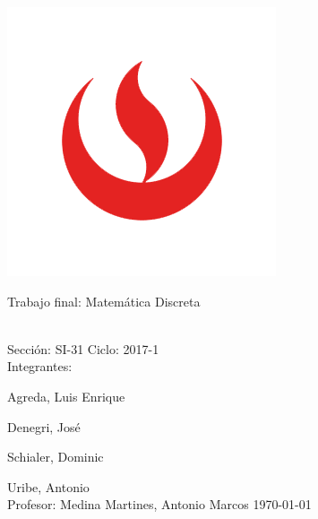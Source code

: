 \documentclass[12pt]{article}
\begin{document}
\begin{titlepage}
\begin{center}
\includegraphics[scale=0.2]{logo_upc.png}

\begin{Huge}
Trabajo final: Matem\'{a}tica Discreta
\end{Huge}
\vspace{1.5cm}
\begin{Large}\\
\vspace{0.5cm}
Secci\'{o}n: SI-31 Ciclo: 2017-1\\
\vspace{1.5cm}
Integrantes:\\
\item Agreda, Luis Enrique\\
\item Denegri, Jos\'{e}\\
\item Schialer, Dominic\\
\item Uribe, Antonio\\
\vspace{1.5cm}
Profesor: Medina Martines, Antonio Marcos
\vfill
\today
\end{Large}
\end{center}
\newpage
\tableofcontents
\end{titlepage}
\newpage
\end{document}
